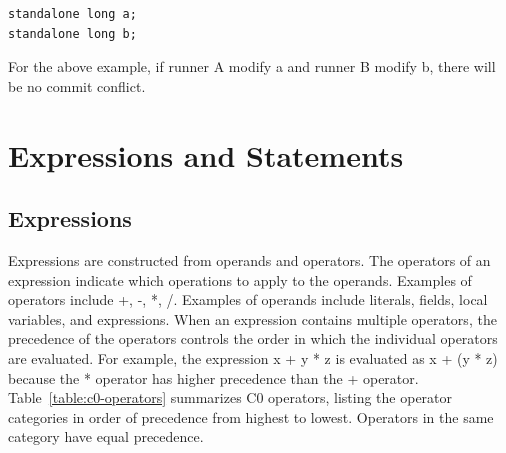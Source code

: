 \documentclass[a4paper]{article}
\begin{document}
\begin{verbatim}
standalone long a;
standalone long b;
\end{verbatim}
For the above example, if runner A modify a and runner B modify b, there will be no commit conflict.

\section{Expressions and Statements}

\subsection{Expressions}
Expressions are constructed from operands and operators. The operators of an expression indicate which operations to apply to the operands. Examples of operators include +, -, *, /. Examples of operands include literals, fields, local variables, and expressions.
When an expression contains multiple operators, the precedence of the operators controls the order in which the individual operators are evaluated. For example, the expression x + y * z is evaluated as x + (y * z) because the * operator has higher precedence than the + operator.
Table~\ref{table:c0-operators} summarizes C0 operators, listing the operator categories in order of precedence from highest to lowest. Operators in the same category have equal precedence.
\end{document}
